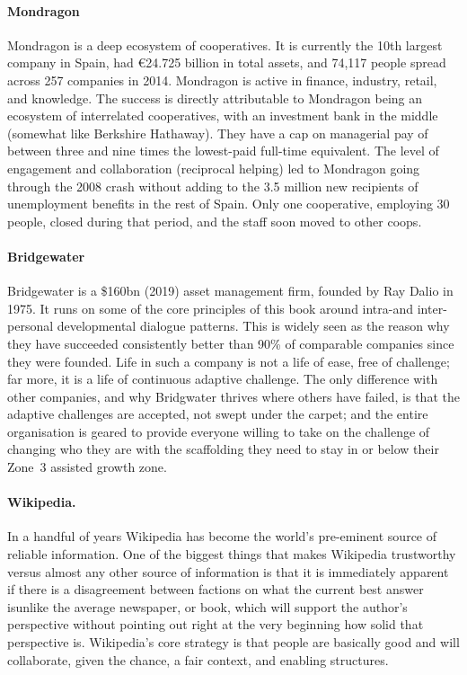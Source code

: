 \paragraph{Mondragon} Mondragon is a deep ecosystem of cooperatives. It is currently the 10th largest company in Spain, had €24.725 billion in total assets, and 74,117 people spread across 257 companies in 2014. Mondragon is active in finance, industry, retail, and knowledge. The success is directly attributable to Mondragon being an ecosystem of interrelated cooperatives, with an investment bank in the middle (somewhat like Berkshire Hathaway). They have a cap on managerial pay of between three and nine times the lowest-paid full-time equivalent. The level of engagement and collaboration (reciprocal helping) led to Mondragon going through the 2008 crash without adding to the 3.5 million new recipients of unemployment benefits in the rest of Spain. Only one cooperative, employing 30 people, closed during that period, and the staff soon moved to other coops.


\paragraph{Bridgewater} Bridgewater  is a \$160bn (2019) asset management firm, founded by Ray Dalio in 1975. It runs on some of the core principles of this book around intra-and inter-personal developmental dialogue patterns\cite{dalio-principles}. This is widely seen as the reason why they have succeeded consistently better than 90\% of comparable companies since they were founded. Life in such a company is not a life of ease, free of challenge; far more, it is a life of continuous adaptive challenge. The only difference with other companies, and why Bridgwater thrives where others have failed, is that the adaptive challenges are accepted, not swept under the carpet; and the entire organisation is geared to provide everyone willing to take on the challenge of changing who they are with the scaffolding they need to stay in or below their Zone~3 assisted growth zone.


\paragraph{Wikipedia.} In a handful of years Wikipedia has become the world's pre-eminent source of reliable information. One of the biggest things that makes Wikipedia trustworthy versus almost any other source of information is that it is immediately apparent if there is a disagreement between factions on what the current best answer is\textemdash unlike the average newspaper, or book, which will support the author’s perspective without pointing out right at the very beginning how solid that perspective is. Wikipedia's core strategy is that people are basically good and will collaborate, given the chance, a fair context, and enabling structures. 


